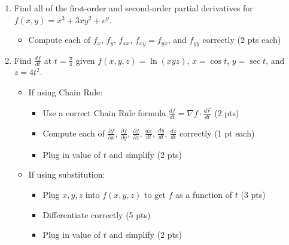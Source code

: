 \documentclass[12pt]{article}
\newcommand{\liner}{\noindent\underline{\hspace*{7in}}}
\begin{document}
\begin{enumerate}
\liner

\newpage


\item Find all of the first-order and second-order partial derivatives for $f(x,y) = x^3+3xy^2+e^y$.

  \begin{itemize}
    \item Compute each of $f_x$, $f_y$, $f_{xx}$, $f_{xy}=f_{yx}$, and $f_{yy}$ correctly (2 pts each)
  \end{itemize}

\vspace*{8in}

\liner

\newpage


\item Find $\frac{df}{dt}$ at $t=\frac{\pi}{4}$ given $f(x,y,z)=\ln(xyz)$, $x=\cos t$, $y=\sec t$, and $z=4t^2$.

  \begin{itemize}
    \item If using Chain Rule:
      \begin{itemize}
        \item Use a correct Chain Rule formula $\frac{df}{dt}=\nabla f \cdot \frac{d\vec{r}}{dt}$ (2 pts)
        \item Compute each of $\frac{\partial f}{\partial x}$, $\frac{\partial f}{\partial y}$, $\frac{\partial f}{\partial z}$, $\frac{d x}{d t}$, $\frac{d y}{d t}$, $\frac{d z}{d t}$ correctly (1 pt each)
        \item Plug in value of $t$ and simplify (2 pts)
      \end{itemize}
    \item If using substitution:
      \begin{itemize}
        \item Plug $x,y,z$ into $f(x,y,z)$ to get $f$ as a function of $t$ (3 pts)
        \item Differentiate correctly (5 pts)
        \item Plug in value of $t$ and simplify (2 pts)
      \end{itemize}
  \end{itemize}

\vspace*{6in}

\liner

\newpage


\end{enumerate}
\end{document}
